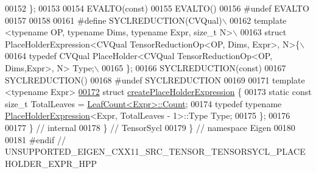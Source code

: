 \begin{DoxyCode}
00152 \textcolor{preprocessor}{\};}
00153 
00154 EVALTO(\textcolor{keyword}{const})
00155 EVALTO()
00156 \textcolor{preprocessor}{#undef EVALTO}
00157 
00158 
00161 \textcolor{preprocessor}{#define SYCLREDUCTION(CVQual)\(\backslash\)}
00162 \textcolor{preprocessor}{template <typename OP, typename Dims, typename Expr, size\_t N>\(\backslash\)}
00163 \textcolor{preprocessor}{struct PlaceHolderExpression<CVQual TensorReductionOp<OP, Dims, Expr>, N>\{\(\backslash\)}
00164 \textcolor{preprocessor}{  typedef CVQual PlaceHolder<CVQual TensorReductionOp<OP, Dims,Expr>, N> Type;\(\backslash\)}
00165 \textcolor{preprocessor}{\};}
00166 SYCLREDUCTION(\textcolor{keyword}{const})
00167 SYCLREDUCTION()
00168 \textcolor{preprocessor}{#undef SYCLREDUCTION}
00169 
00171 \textcolor{keyword}{template} <\textcolor{keyword}{typename} Expr>
\hyperlink{struct_eigen_1_1_tensor_sycl_1_1internal_1_1create_place_holder_expression}{00172} \textcolor{keyword}{struct }\hyperlink{struct_eigen_1_1_tensor_sycl_1_1internal_1_1create_place_holder_expression}{createPlaceHolderExpression} \{
00173   \textcolor{keyword}{static} \textcolor{keyword}{const} \textcolor{keywordtype}{size\_t} TotalLeaves = \hyperlink{struct_eigen_1_1_tensor_sycl_1_1internal_1_1_leaf_count}{LeafCount<Expr>::Count};
00174   \textcolor{keyword}{typedef} \textcolor{keyword}{typename} \hyperlink{struct_eigen_1_1_tensor_sycl_1_1internal_1_1_place_holder_expression}{PlaceHolderExpression}<Expr, TotalLeaves - 1>::Type Type;
00175 \};
00176 
00177 \}  \textcolor{comment}{// internal}
00178 \}  \textcolor{comment}{// TensorSycl}
00179 \}  \textcolor{comment}{// namespace Eigen}
00180 
00181 \textcolor{preprocessor}{#endif  // UNSUPPORTED\_EIGEN\_CXX11\_SRC\_TENSOR\_TENSORSYCL\_PLACEHOLDER\_EXPR\_HPP}
\end{DoxyCode}
